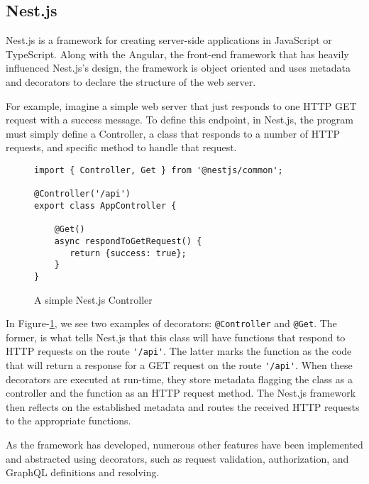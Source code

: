 \subsection{Nest.js} \label{sec:nest-js}
Nest.js is a framework for creating server-side applications in JavaScript or TypeScript.  Along with the Angular, the front-end framework that has heavily influenced Nest.js's design, the framework is object oriented and uses metadata and decorators to declare the structure of the web server.

For example, imagine a simple web server that just responds to one HTTP GET request with a success message.  To define this endpoint, in Nest.js, the program must simply define a Controller, a class that responds to a number of HTTP requests, and specific method to handle that request.

\begin{figure}
    \begin{verbatim}
import { Controller, Get } from '@nestjs/common';

@Controller('/api')
export class AppController {

    @Get()
    async respondToGetRequest() {
       return {success: true};
    }
}
    \end{verbatim}
    \caption{A simple Nest.js Controller}
    \label{fig:nest-controller}
\end{figure}

In Figure-\ref{fig:nest-controller}, we see two examples of decorators: \Verb!@Controller! and \Verb!@Get!.  The former, is what tells Nest.js that this class will have functions that respond to HTTP requests on the route \Verb!'/api'!.  The latter marks the function as the code that will return a response for a GET request on the route \Verb!'/api'!.  When these decorators are executed at run-time, they store metadata flagging the class as a controller and the function as an HTTP request method.  The Nest.js framework then reflects on the established metadata and routes the received HTTP requests to the appropriate functions.

As the framework has developed, numerous other features have been implemented and abstracted using decorators, such as request validation, authorization, and GraphQL definitions and resolving.